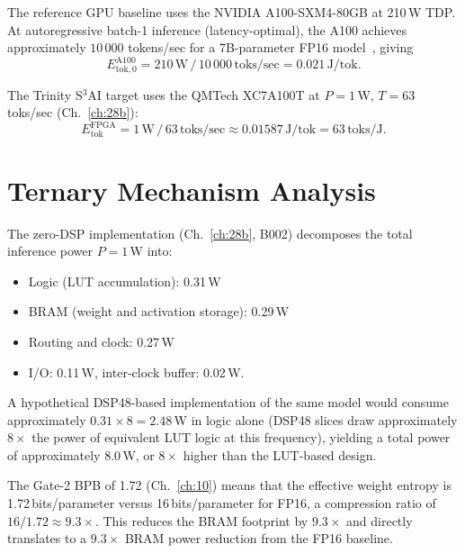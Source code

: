 \begin{definition}
\label{def:gpu-baseline}
The reference GPU baseline uses the NVIDIA A100-SXM4-80GB at 210\,W TDP. At autoregressive batch-1 inference (latency-optimal), the A100 achieves approximately $10\,000$ tokens/sec for a 7B-parameter FP16 model~\cite{mlperf_v41_2024}, giving
\begin{equation}
E_{\mathrm{tok},0}^{\mathrm{A100}} = 210\,\text{W} \,/\, 10\,000\,\text{toks/sec} = 0.021\,\text{J/tok}.
\end{equation}
\end{definition}

\begin{definition}
\label{def:fpga-target}
The Trinity S$^3$AI target uses the QMTech XC7A100T at $P = 1$\,W, $T = 63$\,toks/sec (Ch.~\ref{ch:28b}):
\begin{equation}
E_{\mathrm{tok}}^{\mathrm{FPGA}} = 1\,\text{W} \,/\, 63\,\text{toks/sec} \approx 0.01587\,\text{J/tok} = 63\,\text{toks/J}.
\end{equation}
\end{definition}

\section{Ternary Mechanism Analysis}

\begin{theorem}
\label{thm:dsp-free-power}
The zero-DSP implementation (Ch.~\ref{ch:28b}, B002) decomposes the total inference power $P = 1$\,W into:
\begin{itemize}
\item Logic (LUT accumulation): 0.31\,W
\item BRAM (weight and activation storage): 0.29\,W
\item Routing and clock: 0.27\,W
\item I/O: 0.11\,W, inter-clock buffer: 0.02\,W.
\end{itemize}
A hypothetical DSP48-based implementation of the same model would consume approximately $0.31 \times 8 = 2.48$\,W in logic alone (DSP48 slices draw approximately $8\times$ the power of equivalent LUT logic at this frequency), yielding a total power of approximately 8.0\,W, or $8\times$ higher than the LUT-based design.
\end{theorem}

\begin{proposition}
\label{prop:bpb-efficiency}
The Gate-2 BPB of 1.72 (Ch.~\ref{ch:10}) means that the effective weight entropy is 1.72\,bits/parameter versus 16\,bits/parameter for FP16, a compression ratio of $16/1.72 \approx 9.3\times$. This reduces the BRAM footprint by $9.3\times$ and directly translates to a $9.3\times$ BRAM power reduction from the FP16 baseline.
\end{proposition}

